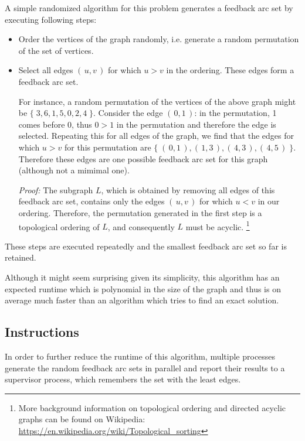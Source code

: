 A simple randomized algorithm for this problem generates a feedback arc set
by executing following steps:

\begin{itemize}
\item Order the vertices of the graph randomly,
i.e. generate a random permutation of the set of vertices.

\item Select all edges $(\,u,v\,)$ for which $u>v$ in the ordering.
These edges form a feedback arc set.

For instance, a random permutation of the vertices of the above graph might be
$\{\;3,6,1,5,0,2,4\;\}$.
Consider the edge $(\,0,1\,)$:
in the permutation, 1 comes before 0, thus $0>1$ in the permutation
and therefore the edge is selected.
Repeating this for all edges of the graph, we find that
the edges for which $u>v$ for this permutation are
$\{\;(\,0,1\,),(\,1,3\,),(\,4,3\,),(\,4,5\,)\;\}$.
Therefore these edges are one possible feedback arc set for this graph
(although not a mimimal one).

\emph{Proof:}
The subgraph $L$, which is obtained by removing all edges of this feedback arc set,
contains only the edges $(\,u,v\,)$ for which $u<v$ in our ordering.
Therefore, the permutation generated in the first step is a topological ordering of $L$,
and consequently $L$ must be acyclic.
\footnote{
More background information on topological ordering and directed acyclic graphs can be found on Wikipedia:\\
\url{https://en.wikipedia.org/wiki/Topological_sorting}
}
\end{itemize}

These steps are executed repeatedly and the smallest feedback arc set so far is retained.

Although it might seem surprising given its simplicity,
this algorithm has an expected runtime which is polynomial in the size of the graph
and thus is on average much faster than an algorithm which tries to find an exact solution.

\clearpage
\subsection*{Instructions}

In order to further reduce the runtime of this algorithm,
multiple processes generate the random feedback arc sets in parallel
and report their results to a supervisor process,
which remembers the set with the least edges.

